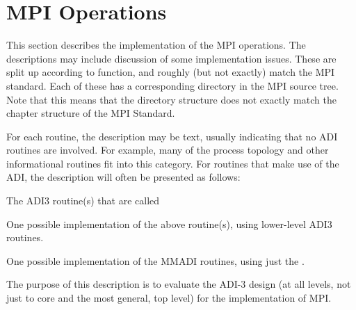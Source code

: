 \documentclass{article}
\begin{document}
\section{MPI Operations}
\label{sec:mpi-operations}
This section describes the implementation of the MPI operations.  The
descriptions may include discussion of some implementation issues.
These are split up according to function, and roughly (but not
exactly) match the MPI standard.  Each of these has a corresponding
directory in the MPI source tree.  Note that this means that the
directory structure does not exactly match the chapter structure of
the MPI Standard.

For each routine, the description may be text, usually indicating that no ADI
routines are involved.  For example, many of the process topology and other
informational routines fit into this category.
For routines that make use of the ADI, the description will often be presented
as follows:
\begin{adi3}The ADI3 routine(s) that are called
\begin{mmadi}One possible implementation of the above routine(s), using
  lower-level ADI3 routines.
\begin{core}One possible implementation of the MMADI routines, using just the
  . 
\end{core}
\end{mmadi}
\end{adi3}
The purpose of this description is to evaluate the ADI-3 design (at all
levels, not just to core and the most general, top level) for the
implementation of MPI.  
\end{document}
